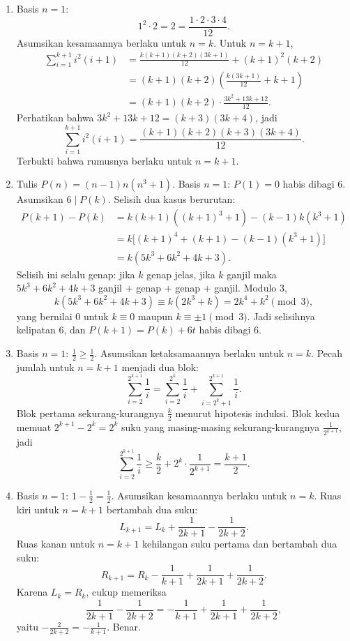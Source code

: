 \documentclass[12pt]{scrartcl}
\begin{document}
\begin{enumerate}
	\item Basis $n = 1$:
	\[ 1^2 \cdot 2 = 2 = \frac{1 \cdot 2 \cdot 3 \cdot 4}{12}. \]
	Asumsikan kesamaannya berlaku untuk $n = k$.
	Untuk $n = k+1$,
	\begin{align*}
	\sum_{i=1}^{k+1} i^2(i+1)
	&= \frac{k(k+1)(k+2)(3k+1)}{12} + (k+1)^2(k+2) \\
	&= (k+1)(k+2)\left(\frac{k(3k+1)}{12} + k+1\right) \\
	&= (k+1)(k+2) \cdot \frac{3k^2 + 13k + 12}{12}.
	\end{align*}
	Perhatikan bahwa $3k^2 + 13k + 12 = (k+3)(3k+4)$, jadi
	\[ \sum_{i=1}^{k+1} i^2(i+1)
	= \frac{(k+1)(k+2)(k+3)(3k+4)}{12}. \]
	Terbukti bahwa rumusnya berlaku untuk $n = k+1$.

	\item Tulis $P(n) = (n-1)n(n^3+1)$.
	Basis $n = 1$: $P(1) = 0$ habis dibagi $6$.
	Asumsikan $6 \mid P(k)$. Selisih dua kasus berurutan:
	\begin{align*}
	P(k+1) - P(k) &= k(k+1)((k+1)^3+1) - (k-1)k(k^3+1) \\
	&= k\big[(k+1)^4 + (k+1) - (k-1)(k^3+1)\big] \\
	&= k(5k^3 + 6k^2 + 4k + 3).
	\end{align*}
	Selisih ini selalu genap: jika $k$ genap jelas,
	jika $k$ ganjil maka $5k^3 + 6k^2 + 4k + 3$ ganjil $+$ genap $+$ genap $+$ ganjil.
	Modulo $3$,
	\[ k(5k^3 + 6k^2 + 4k + 3) \equiv k(2k^3 + k) = 2k^4 + k^2 \pmod{3}, \]
	yang bernilai $0$ untuk $k \equiv 0$ maupun $k \equiv \pm 1 \pmod{3}$.
	Jadi selisihnya kelipatan $6$, dan $P(k+1) = P(k) + 6t$ habis dibagi $6$.

	\item Basis $n = 1$: $\frac12 \ge \frac12$.
	Asumsikan ketaksamaannya berlaku untuk $n = k$.
	Pecah jumlah untuk $n = k+1$ menjadi dua blok:
	\[ \sum_{i=2}^{2^{k+1}} \frac{1}{i}
	= \sum_{i=2}^{2^k} \frac{1}{i} + \sum_{i=2^k+1}^{2^{k+1}} \frac{1}{i}. \]
	Blok pertama sekurang-kurangnya $\frac{k}{2}$ menurut hipotesis induksi.
	Blok kedua memuat $2^{k+1} - 2^k = 2^k$ suku
	yang masing-masing sekurang-kurangnya $\frac{1}{2^{k+1}}$, jadi
	\[ \sum_{i=2}^{2^{k+1}} \frac{1}{i}
	\ge \frac{k}{2} + 2^k \cdot \frac{1}{2^{k+1}}
	= \frac{k+1}{2}. \]

	\item Basis $n = 1$: $1 - \frac12 = \frac12$.
	Asumsikan kesamaannya berlaku untuk $n = k$.
	Ruas kiri untuk $n = k+1$ bertambah dua suku:
	\[ L_{k+1} = L_k + \frac{1}{2k+1} - \frac{1}{2k+2}. \]
	Ruas kanan untuk $n = k+1$ kehilangan suku pertama dan bertambah dua suku:
	\[ R_{k+1} = R_k - \frac{1}{k+1} + \frac{1}{2k+1} + \frac{1}{2k+2}. \]
	Karena $L_k = R_k$, cukup memeriksa
	\[ \frac{1}{2k+1} - \frac{1}{2k+2}
	= -\frac{1}{k+1} + \frac{1}{2k+1} + \frac{1}{2k+2}, \]
	yaitu $-\frac{2}{2k+2} = -\frac{1}{k+1}$. Benar.


\end{enumerate}
\end{document}
